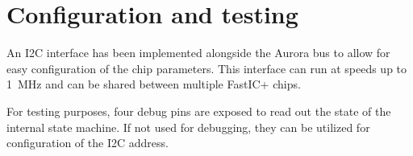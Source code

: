 \section{Configuration and testing}
An I2C interface has been implemented alongside the Aurora bus to allow for easy configuration of the chip parameters. This interface can run at speeds up to \SI{1}{\mega\hertz} and can be shared between multiple FastIC+ chips. 

For testing purposes, four debug pins are exposed to read out the state of the internal state machine. If not used for debugging, they can be utilized for configuration of the I2C address. 